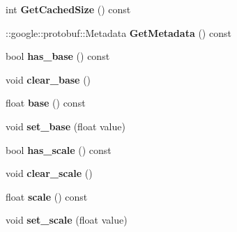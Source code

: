 \begin{DoxyCompactItemize}
\item 
\mbox{\label{classcaffe_1_1_exp_parameter_ab35f87186595977518cfe2cfaa40c342}} 
int {\bfseries Get\+Cached\+Size} () const
\item 
\mbox{\label{classcaffe_1_1_exp_parameter_aafa79e65e05e4ca7bc4faa4595b5db3c}} 
\+::google\+::protobuf\+::\+Metadata {\bfseries Get\+Metadata} () const
\item 
\mbox{\label{classcaffe_1_1_exp_parameter_a882ba10c89d39fe09951f77b33c6efc6}} 
bool {\bfseries has\+\_\+base} () const
\item 
\mbox{\label{classcaffe_1_1_exp_parameter_a5994d9e4d4f655bb04cbd438e2a2b12c}} 
void {\bfseries clear\+\_\+base} ()
\item 
\mbox{\label{classcaffe_1_1_exp_parameter_ad462706ac58bd597b5333c18b8c4fd0e}} 
float {\bfseries base} () const
\item 
\mbox{\label{classcaffe_1_1_exp_parameter_a9c0983fd51fe92ec32e174d194dddd7c}} 
void {\bfseries set\+\_\+base} (float value)
\item 
\mbox{\label{classcaffe_1_1_exp_parameter_a036bd3adb407281938cd7e4ce7fd22fe}} 
bool {\bfseries has\+\_\+scale} () const
\item 
\mbox{\label{classcaffe_1_1_exp_parameter_a5c1efb26cd957df40ea658e21ed96284}} 
void {\bfseries clear\+\_\+scale} ()
\item 
\mbox{\label{classcaffe_1_1_exp_parameter_a605697232f2ed3f4e8e0fda2c90315e8}} 
float {\bfseries scale} () const
\item 
\mbox{\label{classcaffe_1_1_exp_parameter_a83ca370e97d07e2846fd0317924d2139}} 
void {\bfseries set\+\_\+scale} (float value)
\item 
\mbox{\label{classcaffe_1_1_exp_parameter_a5523f2007ce777ca1f137eae1a7bbeda}} 

\end{DoxyCompactItemize}

